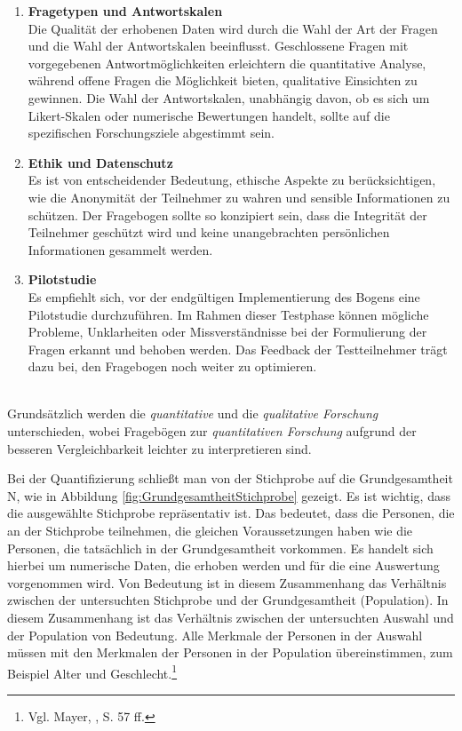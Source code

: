 \begin{enumerate}
    \item \textbf{Fragetypen und Antwortskalen}\\
    Die Qualität der erhobenen Daten wird durch die Wahl der Art der Fragen und die Wahl der Antwortskalen beeinflusst.
    Geschlossene Fragen mit vorgegebenen Antwortmöglichkeiten erleichtern die quantitative Analyse, während offene Fragen
    die Möglichkeit bieten, qualitative Einsichten zu gewinnen. Die Wahl der Antwortskalen, unabhängig davon, ob es sich
    um Likert-Skalen oder numerische Bewertungen handelt, sollte auf die spezifischen Forschungsziele abgestimmt sein.

    \item \textbf{Ethik und Datenschutz}\\
    Es ist von entscheidender Bedeutung, ethische Aspekte zu berücksichtigen, wie die Anonymität der Teilnehmer zu wahren
    und sensible Informationen zu schützen. Der Fragebogen sollte so konzipiert sein, dass die Integrität der Teilnehmer
    geschützt wird und keine unangebrachten persönlichen Informationen gesammelt werden.

    \item \textbf{Pilotstudie}\\
    Es empfiehlt sich, vor der endgültigen Implementierung des Bogens eine Pilotstudie durchzuführen. Im Rahmen
    dieser Testphase können mögliche Probleme, Unklarheiten oder Missverständnisse bei der Formulierung der Fragen erkannt
    und behoben werden. Das Feedback der Testteilnehmer trägt dazu bei, den Fragebogen noch weiter zu optimieren.
\end{enumerate}
\\

Grundsätzlich werden die \textit{quantitative} und die \textit{qualitative Forschung} unterschieden, wobei Fragebögen zur
\textit{quantitativen Forschung} aufgrund der besseren Vergleichbarkeit leichter zu interpretieren sind.

Bei der Quantifizierung schließt man von der Stichprobe auf die Grundgesamtheit N, wie in Abbildung \ref{fig:GrundgesamtheitStichprobe}
gezeigt. Es ist wichtig, dass die ausgewählte Stichprobe repräsentativ ist. Das bedeutet, dass die Personen, die an der
Stichprobe teilnehmen, die gleichen Voraussetzungen haben wie die Personen, die tatsächlich in der Grundgesamtheit vorkommen.
Es handelt sich hierbei um numerische Daten, die erhoben werden und für die eine Auswertung vorgenommen wird. Von Bedeutung
ist in diesem Zusammenhang das Verhältnis zwischen der untersuchten Stichprobe und der Grundgesamtheit (Population). In
diesem Zusammenhang ist das Verhältnis zwischen der untersuchten Auswahl und der Population von Bedeutung. Alle Merkmale
der Personen in der Auswahl müssen mit den Merkmalen der Personen in der Population übereinstimmen, zum Beispiel Alter
und Geschlecht.\footnote{Vgl. Mayer, \cite{Interview und schriftliche Befragung}, S. 57 ff.}

